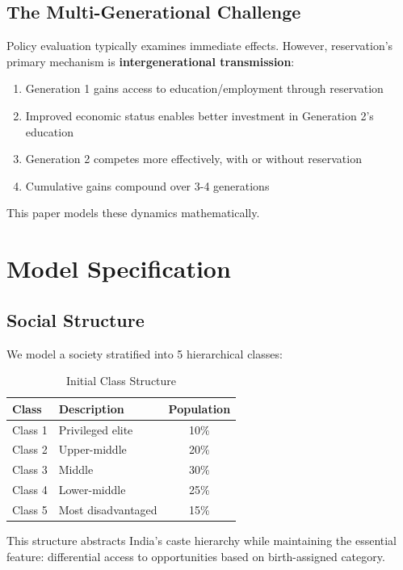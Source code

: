 \documentclass[10pt,twocolumn]{article}
\begin{document}
\subsection{The Multi-Generational Challenge}

Policy evaluation typically examines immediate effects. However, reservation's primary mechanism is \textbf{intergenerational transmission}:

\begin{enumerate}
    \item Generation 1 gains access to education/employment through reservation
    \item Improved economic status enables better investment in Generation 2's education
    \item Generation 2 competes more effectively, with or without reservation
    \item Cumulative gains compound over 3-4 generations
\end{enumerate}

This paper models these dynamics mathematically.

\section{Model Specification}

\subsection{Social Structure}

We model a society stratified into 5 hierarchical classes:

\begin{table}[H]
\centering
\caption{Initial Class Structure}
\begin{tabular}{llc}
\toprule
\textbf{Class} & \textbf{Description} & \textbf{Population} \\
\midrule
Class 1 & Privileged elite & 10\% \\
Class 2 & Upper-middle & 20\% \\
Class 3 & Middle & 30\% \\
Class 4 & Lower-middle & 25\% \\
Class 5 & Most disadvantaged & 15\% \\
\bottomrule
\end{tabular}
\end{table}

This structure abstracts India's caste hierarchy while maintaining the essential feature: differential access to opportunities based on birth-assigned category.
\end{document}

